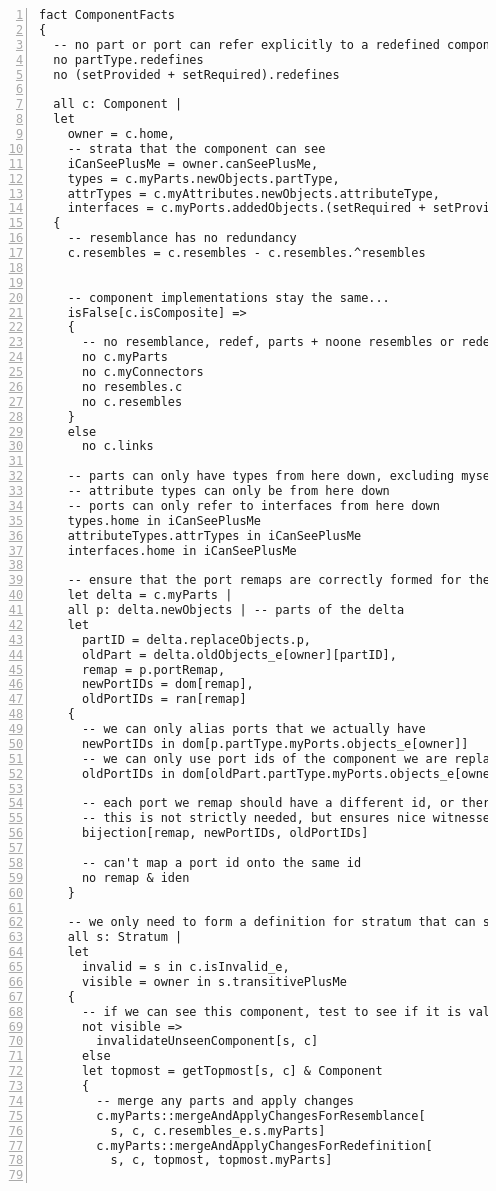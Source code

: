 \begin{lstlisting}[caption={facts.als}, numbers=left]
fact ComponentFacts
{
  -- no part or port can refer explicitly to a redefined component or interface
  no partType.redefines
  no (setProvided + setRequired).redefines

  all c: Component |
  let
    owner = c.home,
    -- strata that the component can see
    iCanSeePlusMe = owner.canSeePlusMe,
    types = c.myParts.newObjects.partType,
    attrTypes = c.myAttributes.newObjects.attributeType,
    interfaces = c.myPorts.addedObjects.(setRequired + setProvided)
  {
    -- resemblance has no redundancy
    c.resembles = c.resembles - c.resembles.^resembles

  
    -- component implementations stay the same...
    isFalse[c.isComposite] =>
    {
      -- no resemblance, redef, parts + noone resembles or redefines it
      no c.myParts
      no c.myConnectors
      no resembles.c
      no c.resembles
    }
    else
      no c.links

    -- parts can only have types from here down, excluding myself...
    -- attribute types can only be from here down
    -- ports can only refer to interfaces from here down
    types.home in iCanSeePlusMe
    attributeTypes.attrTypes in iCanSeePlusMe
    interfaces.home in iCanSeePlusMe
    
    -- ensure that the port remaps are correctly formed for the stratum they are owned by
    let delta = c.myParts |
    all p: delta.newObjects | -- parts of the delta
    let
      partID = delta.replaceObjects.p,
      oldPart = delta.oldObjects_e[owner][partID],
      remap = p.portRemap,
      newPortIDs = dom[remap],
      oldPortIDs = ran[remap]
    {
      -- we can only alias ports that we actually have
      newPortIDs in dom[p.partType.myPorts.objects_e[owner]]
      -- we can only use port ids of the component we are replacing
      oldPortIDs in dom[oldPart.partType.myPorts.objects_e[owner]]
      
      -- each port we remap should have a different id, or there's no point
      -- this is not strictly needed, but ensures nice witnesses
      bijection[remap, newPortIDs, oldPortIDs]
      
      -- can't map a port id onto the same id
      no remap & iden
    }
    
    -- we only need to form a definition for stratum that can see us
    all s: Stratum |
    let
      invalid = s in c.isInvalid_e,
      visible = owner in s.transitivePlusMe
    {
      -- if we can see this component, test to see if it is valid in this stratum
      not visible =>
        invalidateUnseenComponent[s, c]
      else
      let topmost = getTopmost[s, c] & Component
      {  
        -- merge any parts and apply changes
        c.myParts::mergeAndApplyChangesForResemblance[
          s, c, c.resembles_e.s.myParts]
        c.myParts::mergeAndApplyChangesForRedefinition[
          s, c, topmost, topmost.myParts]
          

\end{lstlisting}
